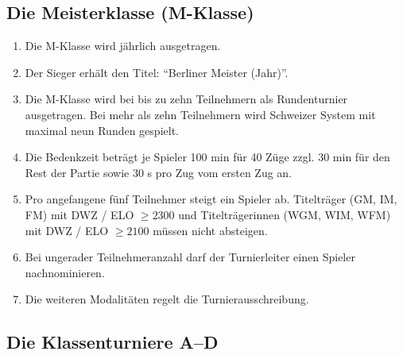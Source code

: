 \documentclass[fontsize=12pt, paper=a4, ngerman]{article}
\begin{document}
\subsection{Die Meisterklasse (M-Klasse)}

\begin{enumerate}
\item Die M-Klasse wird jährlich ausgetragen.
\item Der Sieger erhält den Titel: "`Berliner Meister (Jahr)"'.
\item Die M-Klasse wird bei bis zu zehn Teilnehmern als Rundenturnier ausgetragen. Bei mehr als zehn Teilnehmern wird Schweizer System mit maximal neun Runden gespielt.
\item Die Bedenkzeit beträgt je Spieler 100 min für 40 Züge zzgl. 30 min für den Rest der Partie sowie 30 s pro Zug vom ersten Zug an.
\item Pro angefangene fünf Teilnehmer steigt ein Spieler ab. Titelträger (GM, IM, FM) mit DWZ / ELO $\ge 2300$ und Titelträgerinnen (WGM, WIM, WFM) mit
DWZ / ELO $\ge 2100$ müssen nicht absteigen.
\item Bei ungerader Teilnehmeranzahl darf der Turnierleiter einen Spieler nachnominieren.
\item Die weiteren Modalitäten regelt die Turnierausschreibung.
\end{enumerate}

\subsection{Die Klassenturniere A--D}
\end{document}
